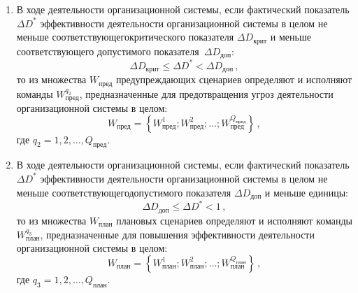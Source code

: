 \begin{multicols}{2}
\begin{enumerate}[1.]
\item В ходе деятельности организационной сис\-те\-мы, если фактический показатель
$\Delta D^*$ эффективности деятельности организационной сис\-те\-мы в целом не
меньше соответствующего\linebreak критиче\-ского показателя $\Delta D_{\mathrm{крит}}$ и
меньше соответствующего допустимого показате\-ля~$\Delta D_{\mathrm{доп}}$:
\begin{equation*}
      \Delta D_{\mathrm{крит}}\leq \Delta D^* < \Delta
D_{\mathrm{доп}}\,,
      \end{equation*}
      то из множества $W_{\mathrm{пред}}$ предупреждающих
сценариев определяют и исполняют команды $W^{q_2}_{\mathrm{пред}}$,
предназначенные для предотвращения угроз деятель\-ности
организационной системы в целом:
      \begin{equation*}
     W_{\mathrm{пред}} = \left\{W^1_{\mathrm{пред}}; W^2_{\mathrm{пред}}; \ldots ;
W^{Q_{\mathrm{пред}}}_{\mathrm{пред}}\right\}\,,
     \end{equation*}
     где $q_2 = 1, 2, \ldots , Q_{\mathrm{пред}}$.

\item В ходе деятельности организационной сис\-те\-мы, если фактический показатель
$\Delta D^*$ эффективности деятельности организационной сис\-те\-мы в целом не
меньше соответствующего\linebreak допустимого показателя $\Delta D_{\mathrm{доп}}$ и меньше
единицы:
\begin{equation*}
      \Delta D_{\mathrm{доп}}\leq \Delta D^* < 1\,, 		
      \end{equation*}
      то из множества $W_{\mathrm{план}}$ плановых сценариев
определяют и исполняют команды $W^{q_3}_{\mathrm{план}}$,
предназначенные для повышения эффективности деятельности
организационной системы в целом:
      \begin{equation*}
     W_{\mathrm{план}} = \left\{W^1_{\mathrm{план}}; W^2_{\mathrm{план}}; \ldots ;
W^{Q_{\mathrm{план}}}_{\mathrm{план}}\right\}\,,
     \end{equation*}
     где $q_3 = 1, 2, \ldots , Q_{\mathrm{план}}$.


\end{enumerate}
\end{multicols}
